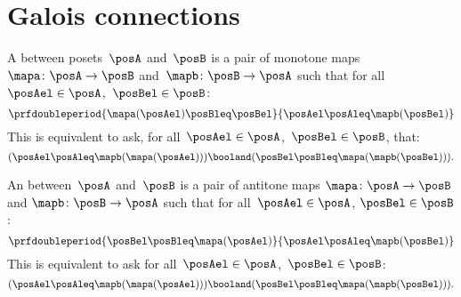 

\section{Galois connections}\label{subsec:galois-connections}

\begin{ctdefinition}
    A \emph{} between posets~$\posA$ and~$\posB$ is a pair of monotone maps~$\mapa\colon \posA\to \posB$ and~$\mapb\colon \posB\to \posA$ such that for all~$\posAel\in \posA$,~$\posBel\in \posB$:
    \begin{equation}
        \prfdoubleperiod{\mapa(\posAel) \posBleq \posBel}{\posAel \posAleq \mapb(\posBel)}
    \end{equation}
    This is equivalent to ask, for all~$\posAel\in \posA$,~$\posBel\in \posB$, that:
    \begin{equation}
        (\posAel\posAleq \mapb(\mapa(\posAel)))
        \booland (\posBel\posBleq \mapa(\mapb(\posBel))).
    \end{equation}
\end{ctdefinition}

\begin{ctdefinition}
    An \emph{} between~$\posA$ and~$\posB$ is a pair of antitone maps $\mapa\colon \posA\to \posB$ and $\mapb \colon \posB\to \posA$ such that for all~$\posAel\in \posA$, $\posBel\in \posB$:
    \begin{equation}
        \prfdoubleperiod{\posBel \posBleq \mapa(\posAel)}{\posAel \posAleq \mapb(\posBel)}
    \end{equation}
    This is equivalent to ask for all~$\posAel\in \posA$,~$\posBel\in \posB$:
    \begin{equation}
        (\posAel \posAleq \mapb(\mapa(\posAel)))
        \booland  (\posBel \posBleq \mapa(\mapb(\posBel))).
    \end{equation}
\end{ctdefinition}

